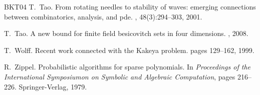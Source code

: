 \documentclass[12pt]{article}
\begin{document}
\begin{thebibliography}{BKT04}
T.~Tao.
\newblock From rotating needles to stability of waves: emerging connections
  between combinatorics, analysis, and pde.
, 48(3):294--303, 2001.

T.~Tao.
\newblock A new bound for finite field besicovitch sets in four dimensions.
, 2008.

T.~Wolff.
\newblock Recent work connected with the {K}akeya problem.
\newblock pages 129--162, 1999.

R.~Zippel.
\newblock Probabilistic algorithms for sparse polynomials.
\newblock In {\em Proceedings of the International Symposiumon on Symbolic and
  Algebraic Computation}, pages 216--226. Springer-Verlag, 1979.

\end{thebibliography}
\end{document}
